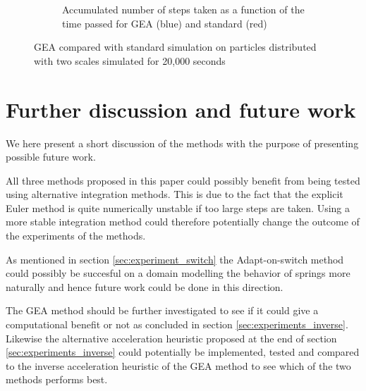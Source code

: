 \documentclass[11pt]{article}
\begin{document}
\begin{figure}
\begin{subfigure}[t]{0.5\textwidth}
        \caption{Accumulated number of steps taken as a function of the time passed for GEA
        (blue) and standard (red)}
        \label{fig:inverse_multiscale_cumstep}
    \end{subfigure}
    \caption{GEA compared with standard simulation on particles distributed with
        two scales simulated for 20,000 seconds}
    \label{fig:inverse_multiscale}
\end{figure}

%


\section{Further discussion and future work}
\label{sec:future_work}
We here present a short discussion of the methods with the purpose of presenting
possible future work.

All three methods proposed in this paper could possibly benefit from being
tested using alternative integration methods. This is due to the fact that
the explicit Euler method is quite numerically unstable if too large steps
are taken. Using a more stable integration method could therefore potentially
change the outcome of the experiments of the methods.

As mentioned in section \ref{sec:experiment_switch} the Adapt-on-switch method
could possibly be succesful on a domain modelling the behavior of springs more
naturally and hence future work could be done in this direction.

The GEA method should be further investigated to see if it could
give a computational benefit or not as concluded in section
\ref{sec:experiments_inverse}. Likewise the alternative acceleration heuristic
proposed at the end of section \ref{sec:experiments_inverse} could potentially
be implemented, tested and compared to the inverse acceleration heuristic of
the GEA method to see which of the two methods performs best.
\end{document}
